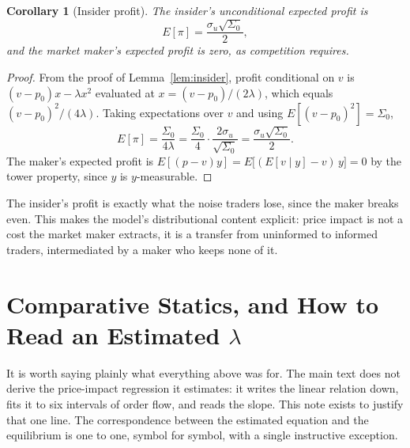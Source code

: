 \documentclass[11pt]{article}
\newtheorem{corollary}{Corollary}
\theoremstyle{remark}
\theoremstyle{definition}
\begin{document}
\begin{corollary}[Insider profit]
\label{cor:profit}
The insider's unconditional expected profit is
\begin{equation*}
E[\pi] = \frac{\sigma_u\sqrt{\Sigma_0}}{2},
\end{equation*}
and the market maker's expected profit is zero, as competition requires.
\end{corollary}

\begin{proof}
From the proof of Lemma~\ref{lem:insider}, profit conditional on $v$ is $(v-p_0)x - \lambda x^2$ evaluated at $x = (v-p_0)/(2\lambda)$, which equals $(v-p_0)^2/(4\lambda)$. Taking expectations over $v$ and using $E[(v-p_0)^2] = \Sigma_0$,
\begin{equation*}
E[\pi] = \frac{\Sigma_0}{4\lambda} = \frac{\Sigma_0}{4}\cdot\frac{2\sigma_u}{\sqrt{\Sigma_0}} = \frac{\sigma_u\sqrt{\Sigma_0}}{2}.
\end{equation*}
The maker's expected profit is $E[(p-v)y] = E\big[(E[v\mid y]-v)\,y\big] = 0$ by the tower property, since $y$ is $y$-measurable.
\end{proof}

The insider's profit is exactly what the noise traders lose, since the maker breaks even. This makes the model's distributional content explicit: price impact is not a cost the market maker extracts, it is a transfer from uninformed to informed traders, intermediated by a maker who keeps none of it.

\section{Comparative Statics, and How to Read an Estimated \texorpdfstring{$\lambda$}{lambda}}
\label{sec:comparative}

It is worth saying plainly what everything above was for. The main text does not derive the price-impact regression it estimates: it writes the linear relation down, fits it to six intervals of order flow, and reads the slope. This note exists to justify that one line. The correspondence between the estimated equation and the equilibrium is one to one, symbol for symbol, with a single instructive exception.
\end{document}

